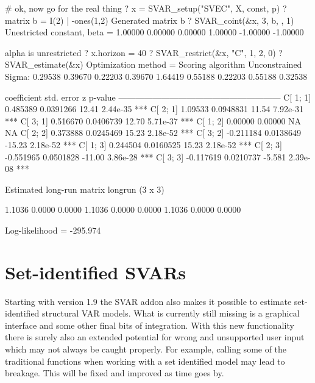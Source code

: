 \documentclass[a4paper,10pt]{article}
\begin{document}
\begin{code}
# ok, now go for the real thing
? x = SVAR_setup("SVEC", X, const, p)
? matrix b = I(2) | -ones(1,2)
Generated matrix b
? SVAR_coint(&x, 3, b, {}, 1)
Unestricted constant, beta =
  1.00000  0.00000
  0.00000  1.00000
 -1.00000 -1.00000

alpha is unrestricted
? x.horizon = 40
? SVAR_restrict(&x, "C", 1, 2, 0)
? SVAR_estimate(&x)
Optimization method = Scoring algorithm
Unconstrained Sigma:
     0.29538     0.39670     0.22203
     0.39670     1.64419     0.55188
     0.22203     0.55188     0.32538


             coefficient   std. error      z       p-value 
  ---------------------------------------------------------
  C[ 1; 1]     0.485389    0.0391266     12.41     2.44e-35 ***
  C[ 2; 1]     1.09533     0.0948831     11.54     7.92e-31 ***
  C[ 3; 1]     0.516670    0.0406739     12.70     5.71e-37 ***
  C[ 1; 2]     0.00000     0.00000       NA       NA       
  C[ 2; 2]     0.373888    0.0245469     15.23     2.18e-52 ***
  C[ 3; 2]    -0.211184    0.0138649    -15.23     2.18e-52 ***
  C[ 1; 3]     0.244504    0.0160525     15.23     2.18e-52 ***
  C[ 2; 3]    -0.551965    0.0501828    -11.00     3.86e-28 ***
  C[ 3; 3]    -0.117619    0.0210737     -5.581    2.39e-08 ***

Estimated long-run matrix
longrun (3 x 3)

      1.1036       0.0000       0.0000 
      1.1036       0.0000       0.0000 
      1.1036       0.0000       0.0000 
	  
  Log-likelihood = -295.974
\end{code}


\section{Set-identified SVARs}\label{sec:SR}

Starting with version 1.9 the SVAR addon also makes it possible to 
estimate set-identified structural VAR models. 
What is currently still missing is a graphical interface and some other final
bits of integration. With this new functionality there is surely also an extended
potential for 
wrong and unsupported user input which may not always be caught properly. 
For example, calling some of the traditional functions when working with a set
identified model may lead to breakage. This will be fixed and improved as time
goes by.
\end{document}
